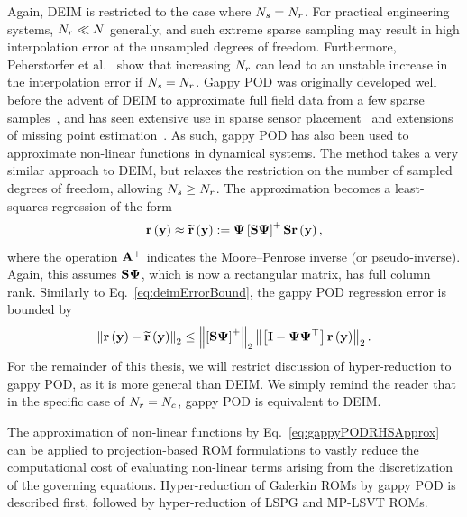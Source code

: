 Again, DEIM is restricted to the case where $N_s = N_r$. For practical engineering systems, $N_r \ll N$ generally, and such extreme sparse sampling may result in high interpolation error at the unsampled degrees of freedom. Furthermore, Peherstorfer et al.~\cite{Peherstorfer2020} show that increasing $N_r$ can lead to an unstable increase in the interpolation error if $N_s = N_r$. Gappy POD was originally developed well before the advent of DEIM to approximate full field data from a few sparse samples~\cite{Everson1995}, and has seen extensive use in sparse sensor placement~\cite{willcoxGappyPOD,ManoharSparseSensor} and extensions of missing point estimation~\cite{Zimmermann2016}. As such, gappy POD has also been used to approximate non-linear functions in dynamical systems. The method takes a very similar approach to DEIM, but relaxes the restriction on the number of sampled degrees of freedom, allowing $N_s \ge N_r$. The approximation becomes a least-squares regression of the form
%
\begin{equation}\label{eq:gappyPODRHSApprox}
    \resFunc{\dummyVec} \approx \resApproxFunc{\dummyVec} \defEq \deimBasis \left[ \sampMat \deimBasis \right]^{+} \sampMat \resFunc{\dummyVec},
\end{equation}
%
where the operation $\mathbf{A}^+$ indicates the Moore--Penrose inverse (or pseudo-inverse). Again, this assumes $\sampMat \deimBasis$, which is now a rectangular matrix, has full column rank. Similarly to Eq.~\ref{eq:deimErrorBound}, the gappy POD regression error is bounded by
%
\begin{equation}\label{eq:gappyPODErrorBound}
    \left\Vert \resFunc{\dummyVec} - \resApproxFunc{\dummyVec} \right\Vert_2 \le \left\Vert \left[ \sampMat \deimBasis \right]^{+} \right\Vert_2 \left\Vert \left[ \identMat - \deimBasis \deimBasis^\top \right] \resFunc{\dummyVec} \right\Vert_2.
\end{equation}
%
For the remainder of this thesis, we will restrict discussion of hyper-reduction to gappy POD, as it is more general than DEIM. We simply remind the reader that in the specific case of $N_r = N_c$, gappy POD is equivalent to DEIM.

The approximation of non-linear functions by Eq.~\ref{eq:gappyPODRHSApprox} can be applied to projection-based ROM formulations to vastly reduce the computational cost of evaluating non-linear terms arising from the discretization of the governing equations. Hyper-reduction of Galerkin ROMs by gappy POD is described first, followed by hyper-reduction of LSPG and MP-LSVT ROMs.

